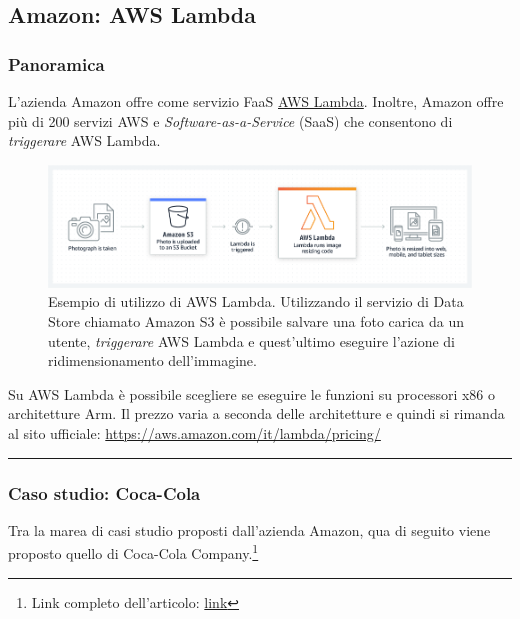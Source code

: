 \documentclass[a4paper]{article}
\newcommand{\longline}{\noindent\rule{\textwidth}{0.4pt}}
\begin{document}
	\subsection{Amazon: AWS Lambda}
	
	\subsubsection{Panoramica}
	
	L'azienda Amazon offre come servizio FaaS \href{https://aws.amazon.com/lambda/?nc2=h_ql_prod_fs_lbd}{AWS Lambda}. Inoltre, Amazon offre più di 200 servizi AWS e \emph{Software-as-a-Service} (SaaS) che consentono di \emph{triggerare} AWS Lambda.
	\begin{figure}[!htp]
		\centering
		\includegraphics[width=\textwidth]{img/AWS-Lambda-1.png}
		\caption{Esempio di utilizzo di AWS Lambda. Utilizzando il servizio di Data Store chiamato Amazon S3 è possibile salvare una foto carica da un utente, \emph{triggerare} AWS Lambda e quest'ultimo eseguire l'azione di ridimensionamento dell'immagine.}
	\end{figure}
	
	\noindent
	Su AWS Lambda è possibile scegliere se eseguire le funzioni su processori x86 o architetture Arm. Il prezzo varia a seconda delle architetture e quindi si rimanda al sito ufficiale: \url{https://aws.amazon.com/it/lambda/pricing/}
	
	\longline
	
	\subsubsection{Caso studio: Coca-Cola}
	
	Tra la marea di casi studio proposti dall'azienda Amazon, qua di seguito viene proposto quello di Coca-Cola Company.\footnote{Link completo dell'articolo: \href{https://aws.amazon.com/solutions/case-studies/coca-cola-freestyle/?nc1=h_ls}{link}}\newline
	
\end{document}

